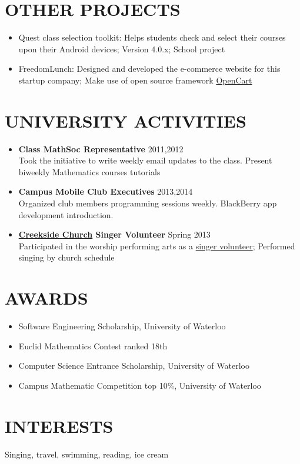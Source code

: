 \documentclass[line,margin]{res}
\begin{document}
\begin{resume}
\section{\uppercase{Other Projects}}
\begin{itemize}
\item Quest class selection toolkit: Helps students check and select their courses upon their Android devices; Version 4.0.x; School project
\item FreedomLunch: Designed and developed the e-commerce website for this startup company; Make use of open source framework \href{http://www.opencart.com/}{OpenCart}
\end{itemize}

\section{\uppercase{University Activities}}
\begin{itemize}
\item {\bf Class MathSoc Representative} \hfill 2011,2012 \\
Took the initiative to write weekly email updates to the class. Present biweekly Mathematics courses tutorials
\item {\bf Campus Mobile Club Executives} \hfill 2013,2014 \\
Organized club members programming sessions weekly. BlackBerry app development introduction. \item {\bf \href{http://www.creeksidechurch.ca/index.php}{Creekside Church} Singer Volunteer} \hfill Spring 2013 \\
Participated in the worship performing arts as a \href{http://www.creeksidechurch.ca/volunteer.php}{singer volunteer}; Performed singing by church schedule
\end{itemize}

\section{\uppercase{Awards}}
\begin{itemize}
\item Software Engineering Scholarship, University of Waterloo
\item Euclid Mathematics Contest ranked 18th
\item Computer Science Entrance Scholarship, University of Waterloo
\item Campus Mathematic Competition top 10\%, University of Waterloo
\end{itemize}

\section{\uppercase{Interests}}
Singing, travel, swimming, reading, ice cream

\end{resume} 
\end{document}
